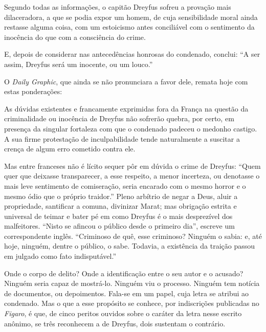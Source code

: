 \begin{hedraquote}
Segundo todas as informações, o capitão Dreyfus sofreu a provação mais
dilaceradora, a que se podia expor um homem, de cuja sensibilidade
moral ainda restasse alguma coisa, com um estoicismo antes conciliável
com o sentimento da inocência do que com a consciência do crime.
\end{hedraquote}

E, depois de considerar nas antecedências honrosas do condenado,
conclui: ``A ser assim, Dreyfus será um inocente, ou um louco.''

O \textit{Daily Graphic}, que ainda se não pronunciara a favor dele, remata hoje
com estas ponderações:

\begin{hedraquote}
As dúvidas existentes e francamente exprimidas fora da França na questão
da criminalidade ou inocência de Dreyfus não sofrerão quebra, por
certo, em presença da singular fortaleza com que o condenado padeceu o
medonho castigo. A sua firme protestação de inculpabilidade tende
naturalmente a suscitar a crença de algum erro cometido contra ele.
\end{hedraquote}

Mas entre franceses não é lícito sequer pôr em dúvida o crime de
Dreyfus: ``Quem quer que deixasse transparecer, a esse
respeito, a menor incerteza, ou denotasse o mais leve sentimento de
comiseração, seria encarado com o mesmo horror e o mesmo ódio que o
próprio traidor.'' Pleno arbítrio de negar a Deus, aluir a
propriedade, santificar a comuna, divinizar Marat; mas obrigação
estrita e universal de teimar e bater pé em como Dreyfus é o mais
desprezível dos malfeitores. ``Nisto se afincou o público
desde o primeiro dia'', escreve um correspondente inglês.
``Criminoso de quê, esse criminoso? Ninguém o sabia: e,
até hoje, ninguém, dentre o público, o sabe. Todavia, a existência da
traição passou em julgado como fato indisputável.''

Onde o corpo de delito? Onde a identificação entre o seu autor e o
acusado? Ninguém seria capaz de mostrá-lo. Ninguém viu o processo.
Ninguém tem notícia de documentos, ou depoimentos. Fala-se em um
papel, cuja letra se atribui ao condenado. Mas o que a esse propósito
se conhece, por indiscrições publicadas no \textit{Figaro}, é que, de cinco
peritos ouvidos sobre o caráter da letra nesse escrito anônimo, se três
reconhecem a de Dreyfus, dois sustentam o contrário.

